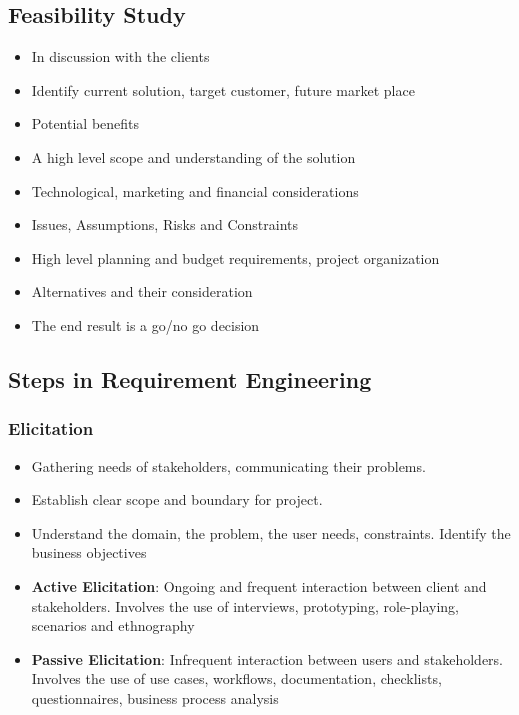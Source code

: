 \documentclass{article}
\begin{document}
\subsection{Feasibility Study}
\begin{itemize}
    \item In discussion with the clients
    
    \item Identify current solution, target customer, future market place
    
    \item Potential benefits
    
    \item A high level scope and understanding of the solution
    
    \item Technological, marketing and financial considerations
    
    \item Issues, Assumptions, Risks and Constraints
    
    \item High level planning and budget requirements, project organization
    
    \item Alternatives and their consideration
    
    \item The end result is a go/no go decision

\end{itemize}

\subsection{Steps in Requirement Engineering}
\subsubsection{Elicitation}
\begin{itemize}
    \item Gathering needs of stakeholders, communicating their problems.
    
    \item Establish clear scope and boundary for project.
    
    \item Understand the domain, the problem, the user needs, constraints. Identify the business objectives
    
    \item \textbf{Active Elicitation}: Ongoing and frequent interaction between client and stakeholders. Involves the use of interviews, prototyping, role-playing, scenarios and ethnography
    
    \item \textbf{Passive Elicitation}: Infrequent interaction between users and stakeholders. Involves the use of use cases, workflows, documentation, checklists, questionnaires, business process analysis
\end{itemize}
\end{document}
